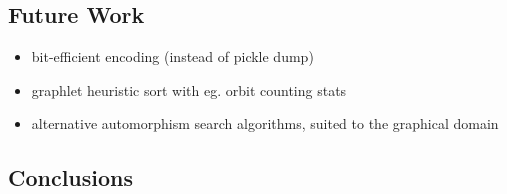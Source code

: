 \documentclass{egpubl}
\begin{document}
\subsection{Future Work}
\begin{itemize}
        \item bit-efficient encoding (instead of pickle dump)
        \item graphlet heuristic sort with eg. orbit counting stats
        \item alternative automorphism search algorithms, suited to the graphical domain
\end{itemize}

\subsection{Conclusions}



%



\end{document}
